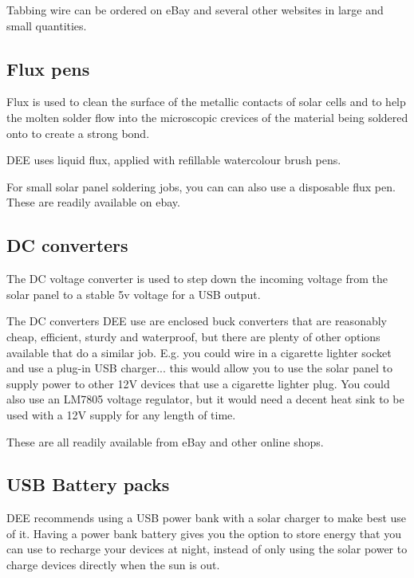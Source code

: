 \documentclass{article}
\theoremstyle{definition}
\theoremstyle{definition}
\theoremstyle{remark}
\begin{document}
    Tabbing wire can be ordered on eBay and several other websites in large and small quantities. 
  

  \subsection*{Flux pens} %
  \label{sub:flux_pens}

    Flux is used to clean the surface of the metallic contacts of solar cells and to help the molten solder flow into the microscopic crevices of the material being soldered onto to create a strong bond.

    DEE uses liquid flux, applied with refillable watercolour brush pens. 

    For small solar panel soldering jobs, you can can also use a disposable flux pen. These are readily available on ebay.


  \subsection*{DC converters} %
  \label{sub:dc_converters}

    The DC voltage converter is used to step down the incoming voltage from the solar panel to a stable 5v voltage for a USB output. 

    The DC converters DEE use are enclosed buck converters that are reasonably cheap, efficient, sturdy and waterproof, but there are plenty of other options available that do a similar job. E.g. you could wire in a cigarette lighter socket and use a plug-in USB charger... this would allow you to use the solar panel to supply power to other 12V devices that use a cigarette lighter plug. You could also use an LM7805 voltage regulator, but it would need a decent heat sink to be used with a 12V supply for any length of time.

    These are all readily available from eBay and other online shops. 
  

  \subsection*{USB Battery packs} %
  \label{sub:usb_battery_packs}

    DEE recommends using a USB power bank with a solar charger to make best use of it. Having a power bank battery gives you the option to store energy that you can use to recharge your devices at night, instead of only using the solar power to charge devices directly when the sun is out.
\end{document}
